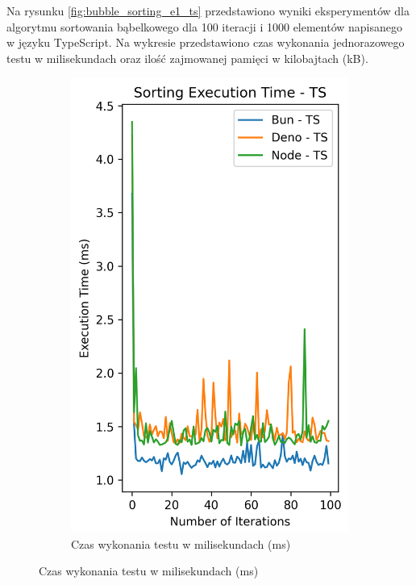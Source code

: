 Na rysunku \ref{fig:bubble_sorting_e1_ts} przedstawiono wyniki eksperymentów dla algorytmu sortowania bąbelkowego dla 100 iteracji i 1000 elementów napisanego w języku TypeScript. Na wykresie przedstawiono czas wykonania jednorazowego testu w milisekundach oraz ilość zajmowanej pamięci w kilobajtach (kB).

\begin{figure}[H]
  \centering
  \begin{subfigure}[b]{0.4\textwidth}
    \centering
    \includegraphics[width=\textwidth]{Figures/sorting/sorting_bubble_100_1000_ts_time.png}
    \caption{Czas wykonania testu w milisekundach (ms)}
    \label{fig:bubble_sorting_e1_ts_time}

\end{subfigure}
\end{figure}
